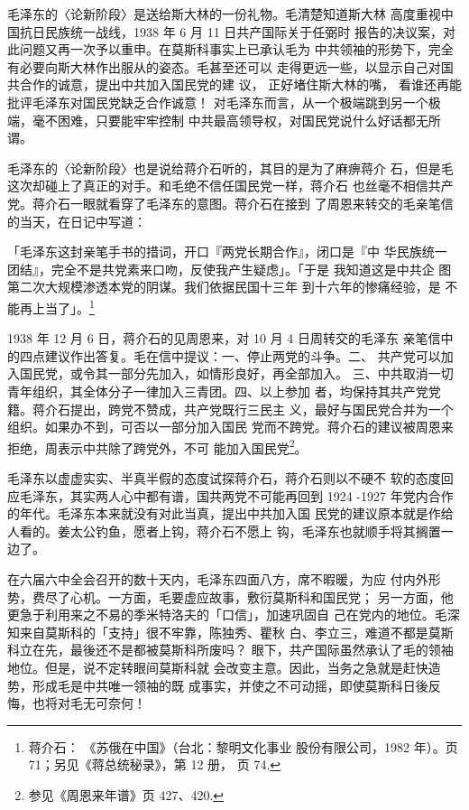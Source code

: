 毛泽东的〈论新阶段〉是送给斯大林的一份礼物。毛清楚知道斯大林
高度重视中国抗日民族统一战线，1938 年 6 月 11 日共产国际关于任弼时
报告的决议案，对此问题又再一次予以重申。在莫斯科事实上已承认毛为
中共领袖的形势下，完全有必要向斯大林作出服从的姿态。毛甚至还可以
走得更远一些，以显示自己对国共合作的诚意，提出中共加入国民党的建
议，
正好堵住斯大林的嘴，
看谁还再能批评毛泽东对国民党缺乏合作诚意！
对毛泽东而言，从一个极端跳到另一个极端，毫不困难，只要能牢牢控制
中共最高领导权，对国民党说什么好话都无所谓。

毛泽东的〈论新阶段〉也是说给蒋介石听的，其目的是为了麻痹蒋介
石，但是毛这次却碰上了真正的对手。和毛绝不信任国民党一样，蒋介石
也丝毫不相信共产党。蒋介石一眼就看穿了毛泽东的意图。蒋介石在接到
了周恩来转交的毛亲笔信的当天，在日记中写道：

「毛泽东这封亲笔手书的措词，开口『两党长期合作』，闭口是『中 华民族统一
团结』，完全不是共党素来口吻，反使我产生疑虑」。「于是 我知道这是中共企
图第二次大规模渗透本党的阴谋。我们依据民国十三年 到十六年的惨痛经验，是
不能再上当了」。\footnote{蒋介石： 《苏俄在中国》（台北：黎明文化事业
股份有限公司，1982 年）。页 71；另见《蒋总统秘录》，第 12 册， 页 74.}
 
1938 年 12 月 6 日，蒋介石的见周恩来，对 10 月 4 日周转交的毛泽东
亲笔信中的四点建议作出答复。毛在信中提议：一、停止两党的斗争。二、
共产党可以加入国民党，或令其一部分先加入，如情形良好，再全部加入。
三、中共取消一切青年组织，其全体分子一律加入三青团。四、以上参加
者，均保持其共产党党籍。蒋介石提出，跨党不赞成，共产党既行三民主
义，最好与国民党合并为一个组织。如果办不到，可否以一部分加入国民
党而不跨党。蒋介石的建议被周恩来拒绝，周表示中共除了跨党外，不可
能加入国民党\footnote{参见《周恩来年谱》页 427、420.}。

毛泽东以虚虚实实、半真半假的态度试探蒋介石，蒋介石则以不硬不
软的态度回应毛泽东，其实两人心中都有谱，国共两党不可能再回到 1924
-1927 年党内合作的年代。毛泽东本来就没有对此当真，提出中共加入国
民党的建议原本就是作给人看的。姜太公钓鱼，愿者上钩，蒋介石不愿上
钩，毛泽东也就顺手将其搁置一边了。

在六届六中全会召开的数十天内，毛泽东四面八方，席不暇暖，为应
付内外形势，费尽了心机。一方面，毛要虚应故事，敷衍莫斯科和国民党；
另一方面，他更急于利用来之不易的季米特洛夫的「口信」，加速巩固自
己在党内的地位。毛深知来自莫斯科的「支持」很不牢靠，陈独秀、瞿秋
白、李立三，难道不都是莫斯科立在先，最後还不是都被莫斯科所废吗？
眼下，共产国际虽然承认了毛的领袖地位。但是，说不定转眼间莫斯科就
会改变主意。因此，当务之急就是赶快造势，形成毛是中共唯一领袖的既
成事实，并使之不可动摇，即使莫斯科日後反悔，也将对毛无可奈何！

